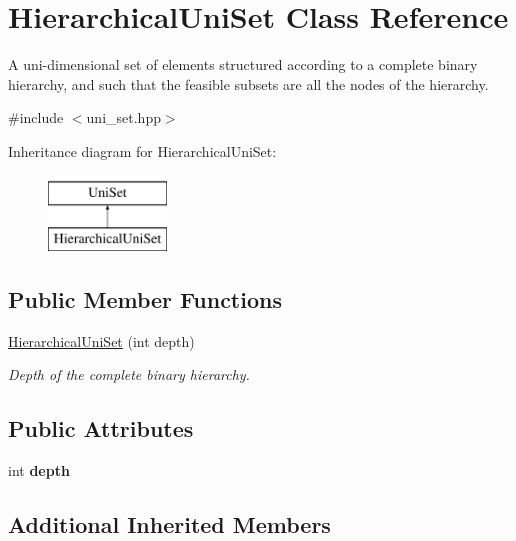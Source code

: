 \hypertarget{classHierarchicalUniSet}{\section{Hierarchical\-Uni\-Set Class Reference}
\label{classHierarchicalUniSet}
}


A uni-\/dimensional set of elements structured according to a complete binary hierarchy, and such that the feasible subsets are all the nodes of the hierarchy.  




{\ttfamily \#include $<$uni\-\_\-set.\-hpp$>$}

Inheritance diagram for Hierarchical\-Uni\-Set\-:\begin{figure}[H]
\begin{center}
\leavevmode
\includegraphics[height=2.000000cm]{classHierarchicalUniSet}
\end{center}
\end{figure}
\subsection*{Public Member Functions}
\begin{DoxyCompactItemize}
\item 
\hyperlink{classHierarchicalUniSet_ab6bfd19708056eb61eb0cd297a96aef0}{Hierarchical\-Uni\-Set} (int depth)
\begin{DoxyCompactList}\small\item\em Depth of the complete binary hierarchy. \end{DoxyCompactList}\end{DoxyCompactItemize}
\subsection*{Public Attributes}
\begin{DoxyCompactItemize}
\item 
\hypertarget{classHierarchicalUniSet_a3b87358df90ea24612e82df44c4eac04}{int {\bfseries depth}}\label{classHierarchicalUniSet_a3b87358df90ea24612e82df44c4eac04}

\end{DoxyCompactItemize}
\subsection*{Additional Inherited Members}


